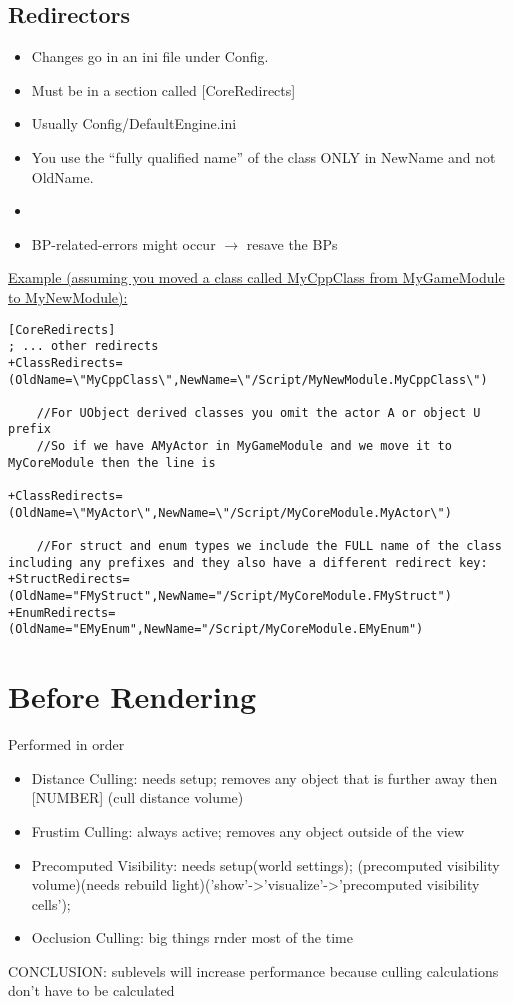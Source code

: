 \documentclass{scrbook}
\begin{document}
        \subsection{Redirectors}
            \begin{itemize}
                \item Changes go in an ini file under Config.
                \item Must be in a section called [CoreRedirects]
                \item Usually Config/DefaultEngine.ini
                \item You use the “fully qualified name” of the class ONLY in NewName and not OldName.
                \item 
                \item BP-related-errors might occur $\rightarrow$ resave the BPs
            \end{itemize}
\uline{Example (assuming you moved a class called MyCppClass from MyGameModule to MyNewModule):}
\begin{lstlisting}
[CoreRedirects]
; ... other redirects
+ClassRedirects=(OldName=\"MyCppClass\",NewName=\"/Script/MyNewModule.MyCppClass\")

    //For UObject derived classes you omit the actor A or object U prefix
    //So if we have AMyActor in MyGameModule and we move it to MyCoreModule then the line is

+ClassRedirects=(OldName=\"MyActor\",NewName=\"/Script/MyCoreModule.MyActor\")

    //For struct and enum types we include the FULL name of the class including any prefixes and they also have a different redirect key:
+StructRedirects=(OldName="FMyStruct",NewName="/Script/MyCoreModule.FMyStruct")
+EnumRedirects=(OldName="EMyEnum",NewName="/Script/MyCoreModule.EMyEnum")
\end{lstlisting}

        \section{Before Rendering}
            Performed in order
            \begin{itemize}
                \item Distance Culling: needs setup; removes any object that is further away then [NUMBER] (cull distance volume)
                \item Frustim Culling: always active; removes any object outside of the view
                \item Precomputed Visibility: needs setup(world settings); (precomputed visibility volume)(needs rebuild light)('show'->'visualize'->'precomputed visibility cells'); 
                \item Occlusion Culling: big things rnder most of the time
            \end{itemize}
            CONCLUSION: sublevels will increase performance because culling calculations don't have to be calculated
\end{document}
